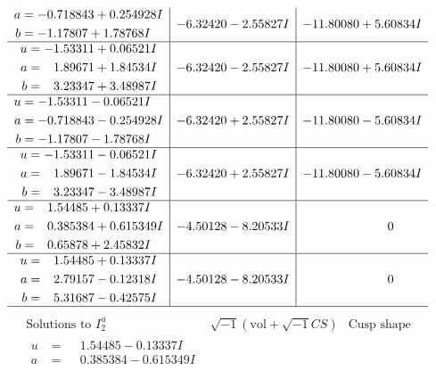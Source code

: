\documentclass[1p]{elsarticle_modified}
\theoremstyle{definition}
\newcommand{\I}{\sqrt{-1}}
\begin{document}
$$\begin{array}{c|c|c}
\begin{aligned}
a &= -0.718843 + 0.254928 I \\
b &= -1.17807 + 1.78768 I\end{aligned}
 & -6.32420 - 2.55827 I & -11.80080 + 5.60834 I \\ \hline\begin{aligned}
u &= -1.53311 + 0.06521 I \\
a &= \phantom{-}1.89671 + 1.84534 I \\
b &= \phantom{-}3.23347 + 3.48987 I\end{aligned}
 & -6.32420 - 2.55827 I & -11.80080 + 5.60834 I \\ \hline\begin{aligned}
u &= -1.53311 - 0.06521 I \\
a &= -0.718843 - 0.254928 I \\
b &= -1.17807 - 1.78768 I\end{aligned}
 & -6.32420 + 2.55827 I & -11.80080 - 5.60834 I \\ \hline\begin{aligned}
u &= -1.53311 - 0.06521 I \\
a &= \phantom{-}1.89671 - 1.84534 I \\
b &= \phantom{-}3.23347 - 3.48987 I\end{aligned}
 & -6.32420 + 2.55827 I & -11.80080 - 5.60834 I \\ \hline\begin{aligned}
u &= \phantom{-}1.54485 + 0.13337 I \\
a &= \phantom{-}0.385384 + 0.615349 I \\
b &= \phantom{-}0.65878 + 2.45832 I\end{aligned}
 & -4.50128 - 8.20533 I & \phantom{-0.000000 } 0 \\ \hline\begin{aligned}
u &= \phantom{-}1.54485 + 0.13337 I \\
a &= \phantom{-}2.79157 - 0.12318 I \\
b &= \phantom{-}5.31687 - 0.42575 I\end{aligned}
 & -4.50128 - 8.20533 I & \phantom{-0.000000 } 0\\
 \hline 
 \end{array}$$\newpage$$\begin{array}{c|c|c}  
\text{Solutions to }I^u_{2}& \I (\text{vol} + \sqrt{-1}CS) & \text{Cusp shape}\\
 \hline 
\begin{aligned}
u &= \phantom{-}1.54485 - 0.13337 I \\
a &= \phantom{-}0.385384 - 0.615349 I \\

\end{aligned}
\end{array}$$
\end{document}

